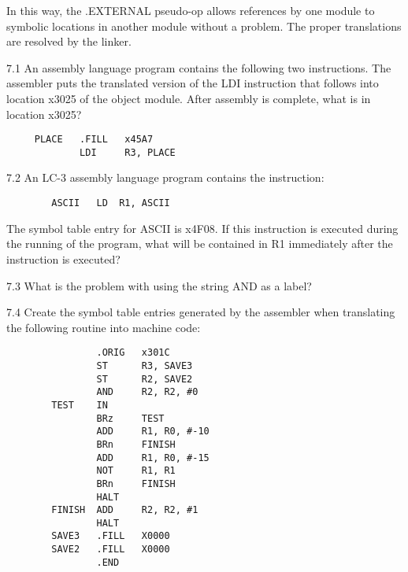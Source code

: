 \documentclass{patt}
\begin{document}
In this way, the .EXTERNAL pseudo-op allows references by one module
to symbolic locations in another module without a problem.  The proper
translations are resolved by the linker.

\vspace{-2pc}

\begin{exercises}
\item[7.1] An assembly language program contains the following two
  instructions.  The assembler puts the translated version of the LDI
  instruction that follows into location x3025 of the object module.
  After assembly is complete, what is in location x3025?
\medskip
\begin{lstlisting}
     PLACE   .FILL   x45A7
             LDI     R3, PLACE
\end{lstlisting}
\medskip

\item[7.2] An LC-3 assembly language program contains the instruction:
\medskip
\begin{lstlisting}
        ASCII   LD  R1, ASCII
\end{lstlisting}
\medskip
\noindent
The symbol table entry for ASCII is x4F08. If this instruction is
executed during the running of the program, what will be contained in
R1 immediately after the instruction is executed?

\item[7.3] What is the problem with using the string AND as a label?

\item[7.4] Create the symbol table entries generated by the assembler
  when translating the following routine into machine code:
\medskip
\begin{lstlisting}
                .ORIG   x301C
                ST      R3, SAVE3
                ST      R2, SAVE2
                AND     R2, R2, #0
        TEST    IN
                BRz     TEST
                ADD     R1, R0, #-10
                BRn     FINISH
                ADD     R1, R0, #-15
                NOT     R1, R1
                BRn     FINISH
                HALT
        FINISH  ADD     R2, R2, #1
                HALT
        SAVE3   .FILL   X0000
        SAVE2   .FILL   X0000
                .END
\end{lstlisting}

\newpage


\end{exercises}
\end{document}
